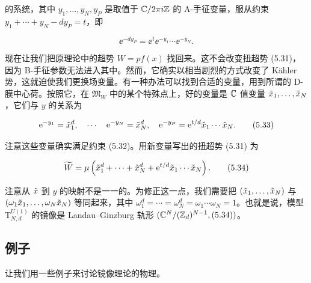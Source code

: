 的系统，其中 $y_1,\dots,y_N,y_P$ 是取值于 $\mathbb{C}/2\pi i\mathbb{Z}$ 的 A-手征变量，服从约束 $y_1+\cdots+y_N-dy_P=t$，即

\begin{equation}
	\ee^{-dy_P} = \ee^{t}\ee^{-y_1}\cdots\ee^{-y_N}. \tag{5.32}
\end{equation}

现在让我们把原理论中的超势 $W=pf(x)$ 找回来。这不会改变扭超势 (5.31)，因为 B-手征参数无法进入其中。然而，它确实以相当剧烈的方式改变了 Kähler 势，这就迫使我们更换场变量。有一种办法可以找到合适的变量，用到所谓的 D-膜中心荷。按照它，在 $\mathfrak{M}_W$ 中的某个特殊点上，好的变量是 $\mathbb{C}$ 值变量 $\tilde x_1,\dots,\tilde x_N$，它们与 $y$ 的关系为

\begin{equation}
	\mathrm{e}^{-y_1} = \tilde x_1^d,\quad\cdots\quad \mathrm{e}^{-y_N} = \tilde x_N^d,\quad \mathrm{e}^{-y_P} = \mathrm{e}^{t/d}\tilde x_1\cdots\tilde x_N. \tag{5.33}
\end{equation}



注意这些变量确实满足约束 (5.32)。用新变量写出的扭超势 (5.31) 为

\begin{equation}
	\widetilde{W} = \mu\left(\tilde x_1^d+\cdots+\tilde x_N^d+\mathrm{e}^{t/d}\tilde x_1\cdots\tilde x_N\right). \tag{5.34}
\end{equation}

注意从 $\tilde x$ 到 $y$ 的映射不是一一的。为修正这一点，我们需要把 $(\tilde x_1,\dots,\tilde x_N)$ 与 $(\omega_1\tilde x_1,\dots,\omega_N\tilde x_N)$ 等同起来，其中 $\omega_1^d=\cdots=\omega_N^d=\omega_1\cdots\omega_N=1$。也就是说，模型 $\mathrm{T}^{U(1)}_{N,d}$ 的镜像是 Landau–Ginzburg 轨形 $(\mathbb{C}^N/(\mathbb{Z}_d)^{N-1},(5.34))$。

\subsection{例子}

让我们用一些例子来讨论镜像理论的物理。



